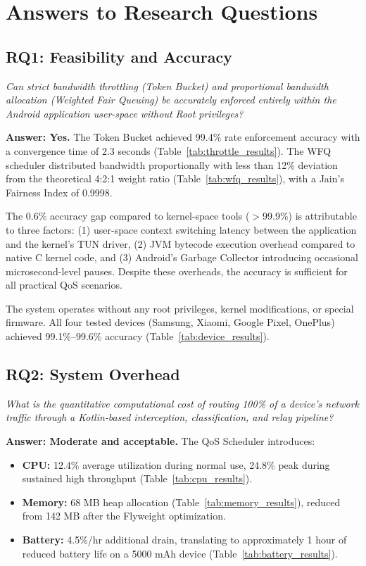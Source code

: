 \section{Answers to Research Questions}
\label{sec:answers_rqs}

\subsection{RQ1: Feasibility and Accuracy}

\textit{Can strict bandwidth throttling (Token Bucket) and proportional bandwidth allocation (Weighted Fair Queuing) be accurately enforced entirely within the Android application user-space without Root privileges?}

\textbf{Answer: Yes.} The Token Bucket achieved 99.4\% rate enforcement accuracy with a convergence time of 2.3 seconds (Table~\ref{tab:throttle_results}). The WFQ scheduler distributed bandwidth proportionally with less than 12\% deviation from the theoretical 4:2:1 weight ratio (Table~\ref{tab:wfq_results}), with a Jain's Fairness Index of 0.9998.

The 0.6\% accuracy gap compared to kernel-space tools ($>$99.9\%) is attributable to three factors: (1) user-space context switching latency between the application and the kernel's TUN driver, (2) JVM bytecode execution overhead compared to native C kernel code, and (3) Android's Garbage Collector introducing occasional microsecond-level pauses. Despite these overheads, the accuracy is sufficient for all practical QoS scenarios.

The system operates without any root privileges, kernel modifications, or special firmware. All four tested devices (Samsung, Xiaomi, Google Pixel, OnePlus) achieved 99.1\%--99.6\% accuracy (Table~\ref{tab:device_results}).

\subsection{RQ2: System Overhead}

\textit{What is the quantitative computational cost of routing 100\% of a device's network traffic through a Kotlin-based interception, classification, and relay pipeline?}

\textbf{Answer: Moderate and acceptable.} The QoS Scheduler introduces:
\begin{itemize}[noitemsep]
    \item \textbf{CPU:} 12.4\% average utilization during normal use, 24.8\% peak during sustained high throughput (Table~\ref{tab:cpu_results}).
    \item \textbf{Memory:} 68 MB heap allocation (Table~\ref{tab:memory_results}), reduced from 142 MB after the Flyweight optimization.
    \item \textbf{Battery:} 4.5\%/hr additional drain, translating to approximately 1 hour of reduced battery life on a 5000 mAh device (Table~\ref{tab:battery_results}).
\end{itemize}

